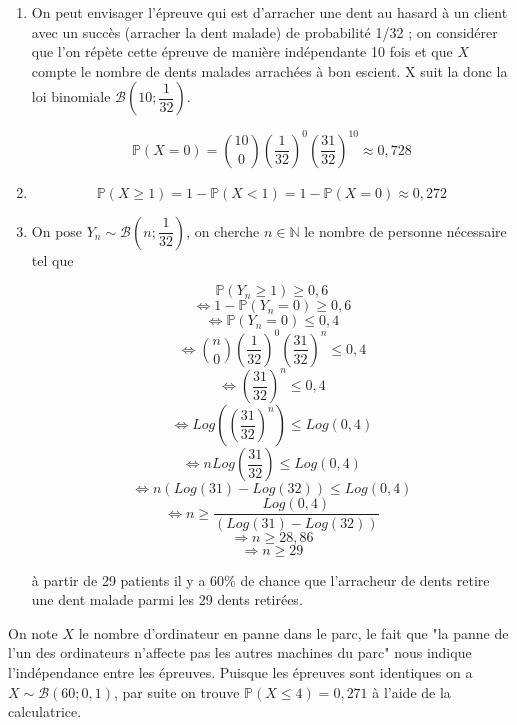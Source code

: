 \documentclass[french]{book}
\begin{document}
\begin{corrige}
\begin{enumerate}


\item On peut envisager l'épreuve qui est d'arracher une dent au hasard à un client avec un succès (arracher la dent malade) de probabilité 1/32 ; on considérer que l'on répète cette épreuve de manière indépendante 10 fois et que $X$ compte le nombre de dents malades
arrachées à bon escient. X suit la donc la  loi binomiale $\mathcal{B}(10;\dfrac{1}{32})$.

$$\mathbb{P}(X=0)=\binom{10}{0}(\dfrac{1}{32})^0(\dfrac{31}{32})^10\approx 0,728$$

\item $$\mathbb{P}(X \geq 1)= 1 - \mathbb{P}(X<1)=1-\mathbb{P}(X=0)\approx 0,272$$

\item On pose $Y_n \sim  \mathcal{B}(n;\dfrac{1}{32})$, on cherche $n\in \mathbb{N}$ le nombre de personne nécessaire tel que 

$$\mathbb{P}(Y_n \geq 1)\geq 0,6$$ 
$$\Longleftrightarrow 1-\mathbb{P}(Y_n=0)\geq 0,6$$
$$\Longleftrightarrow \mathbb{P}(Y_n=0)\leq 0,4$$
$$\Longleftrightarrow \binom{n}{0}(\dfrac{1}{32})^0(\dfrac{31}{32})^n \leq 0,4$$
$$\Longleftrightarrow (\dfrac{31}{32})^n \leq 0,4$$
$$\Longleftrightarrow Log((\dfrac{31}{32})^n) \leq Log(0,4)$$
$$\Longleftrightarrow nLog(\dfrac{31}{32})\leq Log(0,4)$$
$$\Longleftrightarrow n(Log(31)-Log(32)) \leq Log(0,4)$$
$$\Longleftrightarrow n\geq \dfrac{Log(0,4)}{(Log(31)-Log(32))}$$
$$\Longrightarrow n \geq 28,86$$
$$\Longrightarrow n \geq 29$$

à partir de 29 patients il y a 60\% de chance que l'arracheur de dents retire une dent malade parmi les 29 dents retirées.
\end{enumerate}
\end{corrige}

\begin{corrige}
On note $X$ le nombre d'ordinateur en panne dans le parc, le fait que "la panne de l’un des ordinateurs n’affecte pas les autres machines du parc" nous indique l'indépendance entre les épreuves. Puisque les épreuves sont identiques on a $X \sim \mathcal{B}(60;0,1)$, par suite on trouve $\mathbb{P}(X \leq 4)=0,271$ à l'aide de la calculatrice.
\end{corrige}
\end{document}

